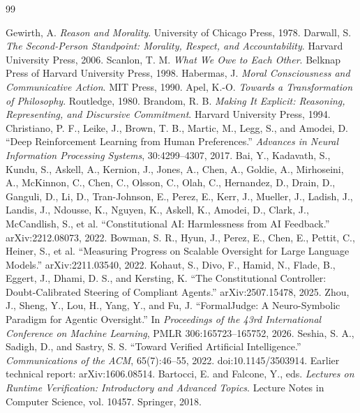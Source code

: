 \documentclass[11pt]{article}
\newcommand{\CanonBibliographySetup}{%
  \small
  \setlength{\parskip}{0.22em}
  \setlength{\itemsep}{0.55em}
}
\begin{document}
\newpage
{}
{}
\begin{thebibliography}{99}
\CanonBibliographySetup

 Gewirth, A. \textit{Reason and Morality}. University of Chicago Press, 1978.
 Darwall, S. \textit{The Second-Person Standpoint: Morality, Respect, and Accountability}. Harvard University Press, 2006.
 Scanlon, T. M. \textit{What We Owe to Each Other}. Belknap Press of Harvard University Press, 1998.
 Habermas, J. \textit{Moral Consciousness and Communicative Action}. MIT Press, 1990.
 Apel, K.-O. \textit{Towards a Transformation of Philosophy}. Routledge, 1980.
 Brandom, R. B. \textit{Making It Explicit: Reasoning, Representing, and Discursive Commitment}. Harvard University Press, 1994.
 Christiano, P. F., Leike, J., Brown, T. B., Martic, M., Legg, S., and Amodei, D. ``Deep Reinforcement Learning from Human Preferences.'' \textit{Advances in Neural Information Processing Systems}, 30:4299--4307, 2017.
 Bai, Y., Kadavath, S., Kundu, S., Askell, A., Kernion, J., Jones, A., Chen, A., Goldie, A., Mirhoseini, A., McKinnon, C., Chen, C., Olsson, C., Olah, C., Hernandez, D., Drain, D., Ganguli, D., Li, D., Tran-Johnson, E., Perez, E., Kerr, J., Mueller, J., Ladish, J., Landis, J., Ndousse, K., Nguyen, K., Askell, K., Amodei, D., Clark, J., McCandlish, S., et al. ``Constitutional AI: Harmlessness from AI Feedback.'' arXiv:2212.08073, 2022.
 Bowman, S. R., Hyun, J., Perez, E., Chen, E., Pettit, C., Heiner, S., et al. ``Measuring Progress on Scalable Oversight for Large Language Models.'' arXiv:2211.03540, 2022.
 Kohaut, S., Divo, F., Hamid, N., Flade, B., Eggert, J., Dhami, D. S., and Kersting, K. ``The Constitutional Controller: Doubt-Calibrated Steering of Compliant Agents.'' arXiv:2507.15478, 2025.
 Zhou, J., Sheng, Y., Lou, H., Yang, Y., and Fu, J. ``FormalJudge: A Neuro-Symbolic Paradigm for Agentic Oversight.'' In \textit{Proceedings of the 43rd International Conference on Machine Learning}, PMLR 306:165723--165752, 2026.
 Seshia, S. A., Sadigh, D., and Sastry, S. S. ``Toward Verified Artificial Intelligence.'' \textit{Communications of the ACM}, 65(7):46--55, 2022. doi:10.1145/3503914. Earlier technical report: arXiv:1606.08514.
 Bartocci, E. and Falcone, Y., eds. \textit{Lectures on Runtime Verification: Introductory and Advanced Topics}. Lecture Notes in Computer Science, vol. 10457. Springer, 2018.

\end{thebibliography}
\end{document}

